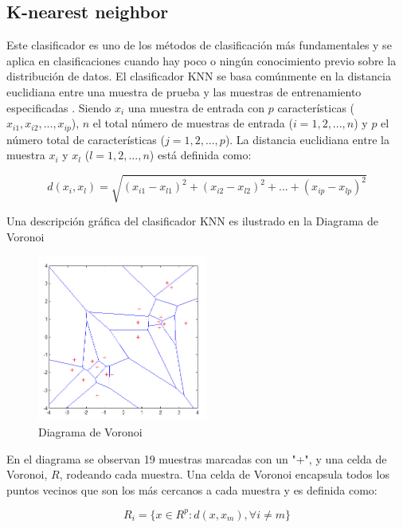 \documentclass[11pt]{report}
\begin{document}
\subsection {K-nearest neighbor}
Este clasificador es uno de los métodos de clasificación más fundamentales y se aplica en clasificaciones cuando hay poco o ningún conocimiento previo sobre la distribución de datos. El clasificador KNN se basa comúnmente en la distancia euclidiana entre una muestra de prueba y las muestras de entrenamiento especificadas \cite{ApplicationHAR}. Siendo $x_i$ una muestra de entrada con $p$ características ($x_{i1}, x_{i2}, ..., x_{ip}$), $n$ el total número de muestras de entrada ($i = 1, 2, ..., n$) y $p$ el número total de características ($j = 1, 2, ..., p$). La distancia euclidiana entre la muestra $x_i$ y $x_l$ ($l = 1, 2, ..., n$) está definida como:

\begin{equation}
d(x_i,x_l) = \sqrt{(x_{i1}-x_{l1})^2 + (x_{i2}-x_{l2})^2 + ... + (x_{ip}-x_{lp})^2}
\end{equation}

Una descripción gráfica del clasificador KNN es ilustrado en la Diagrama de Voronoi

\begin{figure}[H]
  \centering
    \includegraphics[width=0.5\textwidth]{knn_voronoi}
   \caption{Diagrama de Voronoi \cite{randomf}}
\end{figure}  

En el diagrama se observan 19 muestras marcadas con un "+", y una celda de Voronoi, $R$, rodeando cada muestra. Una celda de Voronoi encapsula todos los puntos vecinos que son los más cercanos a cada muestra y es definida como:

\begin{equation}
R_i = \{ x \in  R^p : d(x,x_m), \forall i \neq m \}
\end{equation}
\end{document}
